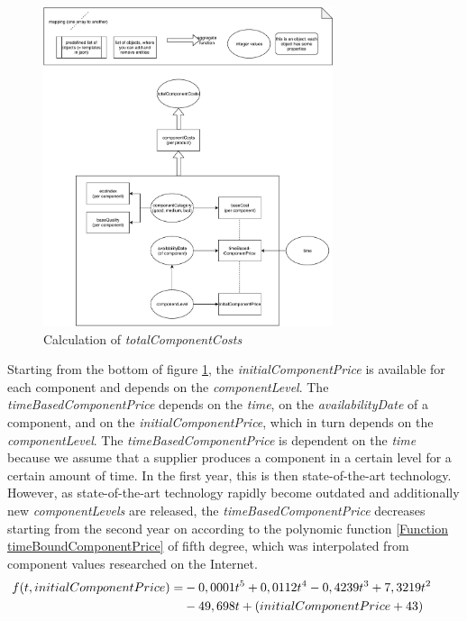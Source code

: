 \begin{figure} [!htbp]
	\centering
	\includegraphics[width=8.5cm]{images/totalComponentCosts.pdf}
	\caption{Calculation of \textit{totalComponentCosts}}
	\label{img:totalComponentCosts}
\end{figure}
Starting from the bottom of figure \ref{img:totalComponentCosts}, the \textit{initialComponentPrice} is available for each component and depends on the \textit{componentLevel}.
The \textit{timeBasedComponentPrice} depends on the \textit{time}, on the \textit{availabilityDate} of a component, and on the \textit{initialComponentPrice}, which in turn depends on the \textit{componentLevel}.
The \textit{timeBasedComponentPrice} is dependent on the \textit{time} because we assume that a supplier produces a component in a certain level for a certain amount of time. In the first year, this is then state-of-the-art technology. However, as state-of-the-art technology rapidly become outdated and additionally new \textit{componentLevels} are released, the \textit{timeBasedComponentPrice} decreases starting from the second year on according to the polynomic function \ref{Function timeBoundComponentPrice} of fifth degree, which was interpolated from component values researched on the Internet.
\begin{equation}
\label{Function timeBoundComponentPrice}
\begin{aligned}
   f(t, initialComponentPrice) = & - 0,0001t\textsuperscript{5} + 0,0112t\textsuperscript{4} - 0,4239t\textsuperscript{3} + 7,3219t\textsuperscript{2} \\
   & - 49,698t + (initialComponentPrice+43)&& 
\end{aligned}   
\end{equation}
